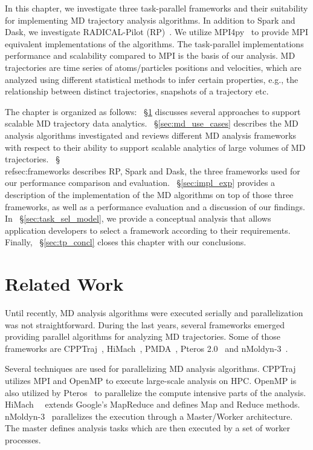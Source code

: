 In this chapter, we investigate three task-parallel frameworks and their
suitability for implementing MD trajectory analysis algorithms. In addition to
Spark and Dask, we investigate RADICAL-Pilot (RP)~\cite{merzky2019using}. We utilize
MPI4py~\cite{dalcin2005mpi} to provide MPI equivalent implementations of the
algorithms. The task-parallel implementations performance and scalability
compared to MPI is the basis of our analysis. MD trajectories are time series of
atoms/particles positions and velocities, which are analyzed using different
statistical methods to infer certain properties, e.g., the relationship between
distinct trajectories, snapshots of a trajectory etc.

The chapter is organized as follows: ~\S\ref{sec:tp_related_work} discusses
several approaches to support scalable MD trajectory data analytics.
~\S\ref{sec:md_use_cases} describes the MD analysis algorithms investigated
and reviews different MD analysis frameworks with respect to their ability to
support scalable analytics of large volumes of MD trajectories.
~\S\\ref{sec:frameworks} describes RP, Spark and  Dask, the three
frameworks used for our performance comparison and evaluation.
~\S\ref{sec:impl_exp} provides a description of the implementation of the
MD algorithms on top of those three frameworks, as well as a performance
evaluation and a discussion of our findings. In
~\S\ref{sec:task_sel_model}, we provide a conceptual analysis that allows
application developers to select a framework according to their requirements.
Finally, ~\S\ref{sec:tp_concl} closes this chapter with our conclusions.


\section{Related Work}
\label{sec:tp_related_work}

Until recently, MD analysis algorithms were executed serially and
parallelization was not straightforward. During the last years, several
frameworks emerged providing parallel algorithms for analyzing MD trajectories.
Some of those frameworks are CPPTraj~\cite{roe2013ptraj,roe2018parallelization},
HiMach~\cite{tiankai2008scalable}, PMDA~\cite{fan2019pmda}, Pteros
2.0~\cite{yesylevskyy2015pteros} and nMoldyn-3~\cite{hinsen2012nmoldyn}.

Several techniques are used for parallelizing MD analysis algorithms.
CPPTraj~\cite{roe2018parallelization} utilizes MPI and OpenMP to execute
large-scale analysis on HPC. OpenMP is also utilized by
Pteros~\cite{yesylevskyy2015pteros} to parallelize the compute intensive parts
of the analysis. HiMach~~\cite{tiankai2008scalable} extends Google's MapReduce
and defines Map and Reduce methods. nMoldyn-3~\cite{hinsen2012nmoldyn}
parallelizes the execution through a Master/Worker architecture. The master
defines analysis tasks which are then executed by a set of worker processes.

